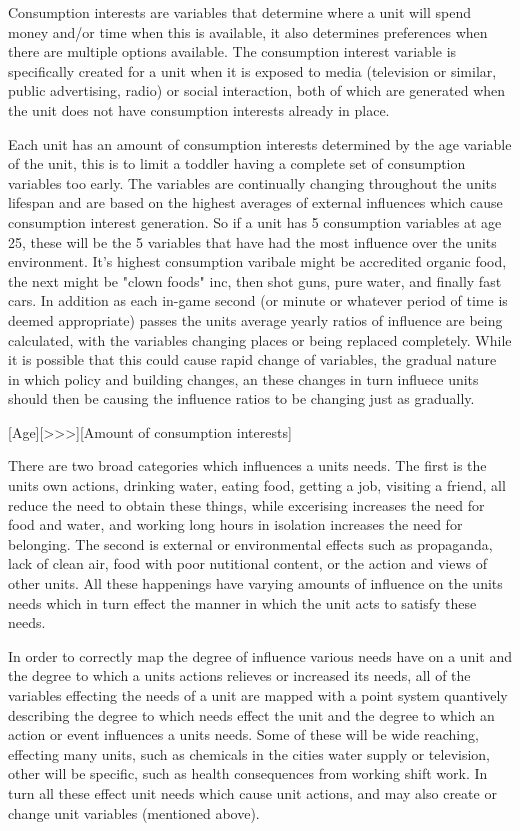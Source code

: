 Consumption interests are variables that determine where a unit will spend money and/or time when this is available, it also determines preferences when there are multiple options available. The consumption interest variable is specifically created for a unit when it is exposed to media (television or similar, public advertising, radio) or social interaction, both of which are generated when the unit does not have consumption interests already in place. 

Each unit has an amount of consumption interests determined by the age variable of the unit, this is to limit a toddler having a complete set of consumption variables too early. The variables are continually changing throughout the units lifespan and are based on the highest averages of external influences which cause consumption interest generation. So if a unit has 5 consumption variables at age 25, these will be the 5 variables that have had the most influence over the units environment. It's highest consumption varibale might be accredited organic food, the next might be "clown foods" inc, then shot guns, pure water, and finally fast cars. In addition as each in-game second (or minute or whatever period of time is deemed appropriate) passes the units average yearly ratios of influence are being calculated, with the variables changing places or being replaced completely. While it is possible that this could cause rapid change of variables, the gradual nature in which policy and building changes, an these changes in turn influece units should then be causing the influence ratios to be changing just as gradually.   


[Age][>>>][Amount of consumption interests] 




There are two broad categories which influences a units needs. The first is the units own actions, drinking water, eating food, getting a job, visiting a friend, all reduce the need to obtain these things, while excerising increases the need for food and water, and working long hours in isolation increases the need for belonging. The second is external or environmental effects such as propaganda, lack of clean air, food with poor nutitional content, or the action and views of other units. All these happenings have varying amounts of influence on the units needs which in turn effect the manner in which the unit acts to satisfy these needs.

In order to correctly map the degree of influence various needs have on a unit and the degree to which a units actions relieves or increased its needs, all of the variables effecting the needs of a unit are mapped with a point system quantively describing the degree to which needs effect the unit and the degree to which an action or event influences a units needs. Some of these will be wide reaching, effecting many units, such as chemicals in the cities water supply or television, other will be specific, such as health consequences from working shift work. In turn all these effect unit needs which cause unit actions, and may also create or change unit variables (mentioned above). 



